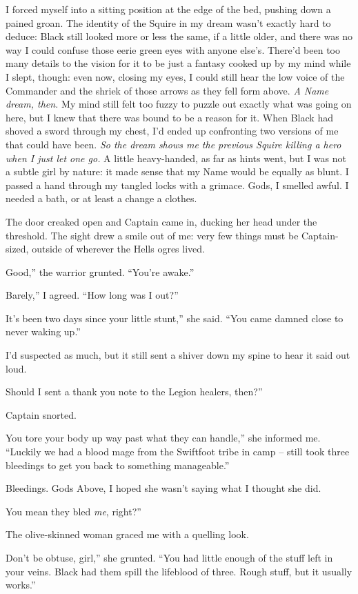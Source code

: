 \documentclass[12pt, openany]{book}
\begin{document}
I forced myself into a sitting position at the edge of the bed, pushing down a pained groan. The identity of the Squire in my dream wasn’t exactly hard to deduce: Black still looked more or less the same, if a little older, and there was no way I could confuse those eerie green eyes with anyone else’s. There’d been too many details to the vision for it to be just a fantasy cooked up by my mind while I slept, though: even now, closing my eyes, I could still hear the low voice of the Commander and the shriek of those arrows as they fell form above. \textit{A Name dream, then.} My mind still felt too fuzzy to puzzle out exactly what was going on here, but I knew that there was bound to be a reason for it. When Black had shoved a sword through my chest, I’d ended up confronting two versions of me that could have been. \textit{So the dream shows me the previous Squire killing a hero when I just let one go. }A little heavy-handed, as far as hints went, but I was not a subtle girl by nature: it made sense that my Name would be equally as blunt. I passed a hand through my tangled locks with a grimace. Gods, I smelled awful. I needed a bath, or at least a change a clothes.

The door creaked open and Captain came in, ducking her head under the threshold. The sight drew a smile out of me: very few things must be Captain-sized, outside of wherever the Hells ogres lived.

Good,” the warrior grunted. “You’re awake.”

Barely,” I agreed. “How long was I out?”

It’s been two days since your little stunt,” she said. “You came damned close to never waking up.”

I’d suspected as much, but it still sent a shiver down my spine to hear it said out loud.

Should I sent a thank you note to the Legion healers, then?”

Captain snorted.

You tore your body up way past what they can handle,” she informed me. “Luckily we had a blood mage from the Swiftfoot tribe in camp – still took three bleedings to get you back to something manageable.”

Bleedings. Gods Above, I hoped she wasn’t saying what I thought she did.

You mean they bled \textit{me}, right?”

The olive-skinned woman graced me with a quelling look.

Don’t be obtuse, girl,” she grunted. “You had little enough of the stuff left in your veins. Black had them spill the lifeblood of three. Rough stuff, but it usually works.”
\end{document}

